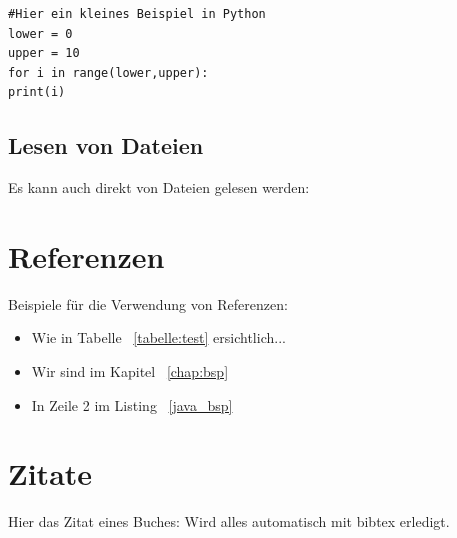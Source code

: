 \begin{lstlisting}[style=Python, caption={Python-Beispiel}, captionpos=b]
#Hier ein kleines Beispiel in Python
lower = 0
upper = 10
for i in range(lower,upper):
print(i)
\end{lstlisting} 


\subsection{Lesen von Dateien}
 
Es kann auch direkt von Dateien gelesen werden:


 
\section{Referenzen}
			
Beispiele für die Verwendung von Referenzen: 

\begin{itemize}
	\item Wie in Tabelle ~\ref{tabelle:test} ersichtlich... 
	\item Wir sind im Kapitel ~\ref{chap:bsp}
	\item In Zeile 2 im Listing ~\ref{java_bsp} 
\end{itemize}


\section{Zitate}


Hier das Zitat eines Buches: \cite{couper2001} Wird alles automatisch mit  bibtex erledigt.